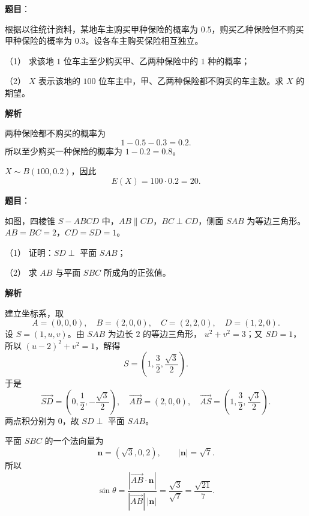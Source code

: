 \begin{answer}

\textbf{题目}：

根据以往统计资料，某地车主购买甲种保险的概率为 $0.5$，购买乙种保险但不购买甲种保险的概率为 $0.3$。设各车主购买保险相互独立。

（1） 求该地 $1$ 位车主至少购买甲、乙两种保险中的 $1$ 种的概率；

（2） $X$ 表示该地的 $100$ 位车主中，甲、乙两种保险都不购买的车主数。求 $X$ 的期望。

\textbf{解析}


两种保险都不购买的概率为
\nopagebreak[4]
\[
1-0.5-0.3=0.2.
\]
所以至少购买一种保险的概率为 $1-0.2=0.8$。


$X\sim B(100,0.2)$，因此
\nopagebreak[4]
\[
E(X)=100\cdot0.2=20.
\]



\end{answer}
\begin{answer}

\textbf{题目}：

如图，四棱锥 $S-ABCD$ 中，$AB\parallel CD$，$BC\perp CD$，侧面 $SAB$ 为等边三角形。$AB=BC=2$，$CD=SD=1$。
\nopagebreak[4]
\begin{center}\end{center}
\nopagebreak[4]
（1） 证明：$SD\perp$ 平面 $SAB$；

（2） 求 $AB$ 与平面 $SBC$ 所成角的正弦值。

\textbf{解析}


建立坐标系，取
\nopagebreak[4]
\[
A=(0,0,0),\quad B=(2,0,0),\quad
C=(2,2,0),\quad D=(1,2,0).
\]
设 $S=(1,u,v)$。由 $SAB$ 为边长 $2$ 的等边三角形，
$u^2+v^2=3$；又 $SD=1$，所以
$(u-2)^2+v^2=1$，解得
\nopagebreak[4]
\[
S=\left(1,\frac32,\frac{\sqrt3}{2}\right).
\]
于是
\nopagebreak[4]
\[
\overrightarrow{SD}=\left(0,\frac12,-\frac{\sqrt3}{2}\right),
\quad
\overrightarrow{AB}=(2,0,0),
\quad
\overrightarrow{AS}=\left(1,\frac32,\frac{\sqrt3}{2}\right).
\]
两点积分别为 $0$，故 $SD\perp$ 平面 $SAB$。


平面 $SBC$ 的一个法向量为
\nopagebreak[4]
\[
\boldsymbol n=(\sqrt3,0,2),\qquad |\boldsymbol n|=\sqrt7.
\]
所以
\nopagebreak[4]
\[
\sin\theta
=\frac{|\overrightarrow{AB}\cdot\boldsymbol n|}
{|\overrightarrow{AB}|\,|\boldsymbol n|}
=\frac{\sqrt3}{\sqrt7}
=\frac{\sqrt{21}}7.
\]



\end{answer}
